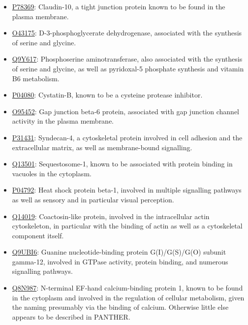 {\begin{itemize}
\item \href{http://www.pantherdb.org/genes/gene.do?acc=HUMAN\%7CHGNC\%3D2033\%7CUniProtKB\%3DP78369}{P78369}: Claudin-10,  a tight junction protein known to be found in the plasma membrane.
\item \href{http://www.pantherdb.org/genes/gene.do?acc=HUMAN\%7CHGNC\%3D8923\%7CUniProtKB\%3DO43175}{O43175}: D-3-phosphoglycerate dehydrogenase, associated with the synthesis of serine and glycine.
\item \href{http://www.pantherdb.org/genes/gene.do?acc=HUMAN\%7CHGNC\%3D19129\%7CUniProtKB\%3DQ9Y617}{Q9Y617}: Phosphoserine aminotransferase, also associated with the synthesis of serine and glycine, as well as pyridoxal-5 phosphate synthesis and vitamin B6 metabolism.
\item \href{http://www.pantherdb.org/genes/gene.do?acc=HUMAN\%7CHGNC\%3D2482\%7CUniProtKB\%3DP04080}{P04080}: Cystatin-B, known to be a cysteine protease inhibitor.
\item \href{http://www.pantherdb.org/genes/gene.do?acc=HUMAN\%7CHGNC\%3D4288\%7CUniProtKB\%3DO95452}{O95452}: Gap junction beta-6 protein, associated with gap junction channel activity in the plasma membrane.
\item \href{http://www.pantherdb.org/genes/gene.do?acc=HUMAN\%7CHGNC\%3D10661\%7CUniProtKB\%3DP31431}{P31431}: Syndecan-4, a cytoskeletal protein involved in cell adhesion and the extracellular matrix, as well as membrane-bound signalling.
\item \href{http://www.pantherdb.org/genes/gene.do?acc=HUMAN\%7CHGNC\%3D11280\%7CUniProtKB\%3DQ13501}{Q13501}: Sequestosome-1, known to be associated with protein binding in vacuoles in the cytoplasm.
\item \href{http://www.pantherdb.org/genes/gene.do?acc=HUMAN\%7CHGNC\%3D5246\%7CUniProtKB\%3DP04792}{P04792}: Heat shock protein beta-1, involved in multiple signalling pathways as well as sensory and in particular visual perception.
\item \href{http://www.pantherdb.org/genes/gene.do?acc=HUMAN\%7CHGNC\%3D18304\%7CUniProtKB\%3DQ14019}{Q14019}: Coactosin-like protein, involved in the intracellular actin cytoskeleton, in particular with the binding of actin as well as a cytoskeletal component itself.
\item \href{http://www.pantherdb.org/genes/gene.do?acc=HUMAN\%7CHGNC\%3D19663\%7CUniProtKB\%3DQ9UBI6}{Q9UBI6}: Guanine nucleotide-binding protein G(I)/G(S)/G(O) subunit gamma-12, involved in GTPase activity, protein binding, and numerous signalling pathways.
\item \href{http://www.pantherdb.org/genes/gene.do?acc=HUMAN\%7CHGNC\%3D20983\%7CUniProtKB\%3DQ8N987}{Q8N987}: N-terminal EF-hand calcium-binding protein 1, known to be found in the cytoplasm and involved in the regulation of cellular metabolism, given the naming presumably via the binding of calcium. Otherwise little else appears to be described in PANTHER.
\end{itemize}

}

